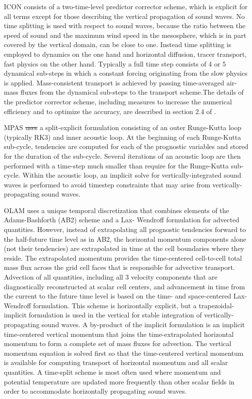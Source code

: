\documentclass[gmd, manuscript]{copernicus}
\providecommand{\DIFadd}[1]{{\protect\color{blue}\uwave{#1}}} %
\providecommand{\DIFdel}[1]{{\protect\color{red}\sout{#1}}}                      %
\providecommand{\DIFaddbegin}{} %
\providecommand{\DIFaddend}{} %
\providecommand{\DIFdelbegin}{} %
\providecommand{\DIFdelend}{} %
\begin{document}
ICON consists of a two-time-level predictor corrector scheme, which is explicit for all terms except for those describing the vertical propagation of sound waves. No time splitting is used with respect to sound waves, because the ratio between the speed of sound and the maximum wind speed in the mesosphere, which is in part covered by the vertical domain, can be close to one. Instead time splitting is employed to dynamics on the one hand and horizontal diffusion, tracer transport, fast physics on the other hand. Typically a full time step consists of 4 or 5 dynamical sub-steps in which a constant forcing originating from the slow physics is applied. Mass-consistent transport is achieved by passing time-averaged air-mass fluxes from the dynamical sub-steps to the transport scheme.The details of the predictor corrector scheme, including measures to increase the numerical efficiency and to optimize the accuracy, are described in section 2.4 of \cite{zangl2015icon}. 

MPAS \DIFdelbegin \DIFdel{uses }\DIFdelend \DIFaddbegin \DIFadd{and NICAM use }\DIFaddend a split-explicit formulation \citep{klemp2007conservative} consisting of an outer Runge-Kutta loop (typically RK3) and inner acoustic loop.  At the beginning of each Runge-Kutta sub-cycle, tendencies are computed for each of the prognostic variables and stored for the duration of the sub-cycle.  Several iterations of an acoustic loop are then performed with a time-step much smaller than require for the Runge-Kutta sub-cycle.  Within the acoustic loop, an implicit solve for vertically-integrated sound waves is performed to avoid timestep constraints that may arise from vertically-propagating sound waves.

OLAM uses a unique temporal discretization that combines elements of the Adams-Bashforth (AB2) scheme and a Lax- Wendroff formulation for advected quantities. However, instead of extrapolating all prognostic tendencies forward to the half-future time level as in AB2, the horizontal momentum components alone (not their tendencies) are extrapolated in time at the cell boundaries where they reside. The extrapolated momentum provides the time-centered cell-to-cell total mass flux across the grid cell faces that is responsible for advective transport. Advection of all quantities, including all 3 velocity components that are diagnostically reconstructed at scalar cell centers, and advancement in time from the current to the future time level is based on the time- and space-centered Lax-Wendroff formulation.   This scheme is horizontally explicit, but a trapezoidal- implicit formulation is used in the vertical for stable integration of vertically-propagating sound waves. A by-product of the implicit formulation is an implicit time-centered vertical momentum that joins the time-extrapolated horizontal momentum to form a complete set of mass fluxes for advection. The vertical momentum equation is solved first so that the time-centered vertical momentum is available for computing transport of horizontal momentum and all scalar quantities. A time-split scheme is most often used where momentum and potential temperature are updated more frequently than other scalar fields in order to accommodate horizontally propagating sound waves.
\end{document}
